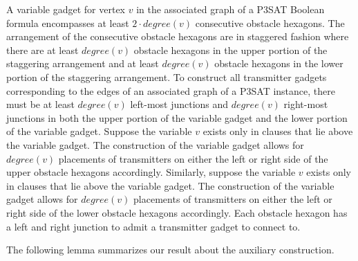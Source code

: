 A variable gadget for vertex $v$ in the associated graph of a P3SAT Boolean formula encompasses at least $2 \cdot degree(v)$ consecutive obstacle hexagons. 
The arrangement of the consecutive obstacle hexagons are in staggered fashion where there are at least $degree(v)$ obstacle hexagons in the upper portion of the staggering arrangement and at least $degree(v)$ obstacle hexagons in the lower portion of the staggering arrangement.
To construct all transmitter gadgets corresponding to the edges of an associated graph of a P3SAT instance, there must be at least $degree(v)$ left-most junctions and $degree(v)$ right-most junctions in both the upper portion of the variable gadget and the lower portion of the variable gadget.
Suppose the variable $v$ exists only in clauses that lie above the variable gadget.  
The construction of the variable gadget allows for $degree(v)$ placements of transmitters on either the left or right side of the upper obstacle hexagons accordingly.
Similarly, suppose the variable $v$ exists only in clauses that lie above the variable gadget.  
The construction of the variable gadget allows for $degree(v)$ placements of transmitters on either the left or right side of the lower obstacle hexagons accordingly.
Each obstacle hexagon has a left and right junction to admit a transmitter gadget to connect to.




The following lemma summarizes our result about the auxiliary construction.


